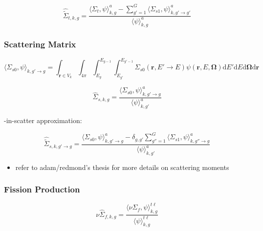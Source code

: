 \begin{equation}
\label{eqn:chap3-transport-macro}
\hat{\tilde{\Sigma}}_{t,k,g} = \frac{\langle \Sigma_{t}, \psi \rangle_{k,g}^{a} - \displaystyle\sum\limits_{g'=1}^{G} \langle{\Sigma_{s1}, \psi \rangle_{k,g'\rightarrow g'}^{a}}}
{\langle \psi \rangle_{k,g}^{a}}
\end{equation}


\subsubsection{Scattering Matrix}
\label{subsubsec:chap3-tally-types-scatt-mat}

\begin{equation}
\label{eqn:chap3-sigs0}
\langle \Sigma_{s0}, \psi \rangle_{k,g'\rightarrow g} = \int_{\mathbf{r} \in V_{k}} \int_{4\pi} \int_{E_{g}}^{E_{g-1}} \int_{E_{g'}}^{E_{g'-1}} \Sigma_{s0}(\mathbf{r},E'\rightarrow E)\psi(\mathbf{r},E,\mathbf{\Omega}) \mathrm{d}E'\mathrm{d}E\mathrm{d}\mathbf{\Omega}\mathrm{d}\mathbf{r}
\end{equation}

\begin{equation}
\label{eqn:chap3-scatter-macro}
\hat{\Sigma}_{s,k,g} = \frac{\langle \Sigma_{s0}, \psi \rangle_{k,g'\rightarrow g}^{a}}{\langle \psi \rangle_{k,g'}^{a}}
\end{equation}

-in-scatter approximation:

\begin{equation}
\label{eqn:chap3-scatter-trans-macro}
\hat{\tilde{\Sigma}}_{s,k,g'\rightarrow g} = \frac{\langle \Sigma_{s0}, \psi \rangle_{k,g'\rightarrow g}^{a} - \delta_{g,g'} \displaystyle\sum\limits_{g''=1}^{G} \langle{\Sigma_{s1}, \psi \rangle_{k,g''\rightarrow g}^{a}}}{\langle \psi \rangle_{k,g'}^{a}}
\end{equation}

\begin{itemize}[noitemsep]
  \item refer to adam/redmond's thesis for more details on scattering moments
\end{itemize}

\subsubsection{Fission Production}
\label{subsubsec:chap3-tally-types-fiss-prod}

\begin{equation}
\label{eqn:chap3-nu-fiss-macro}
\nu\hat{\Sigma}_{f,k,g} = \frac{\langle \nu\Sigma_{f}, \psi \rangle_{k,g}^{t\ell}}{\langle \psi \rangle_{k,g}^{t\ell}}
\end{equation}


